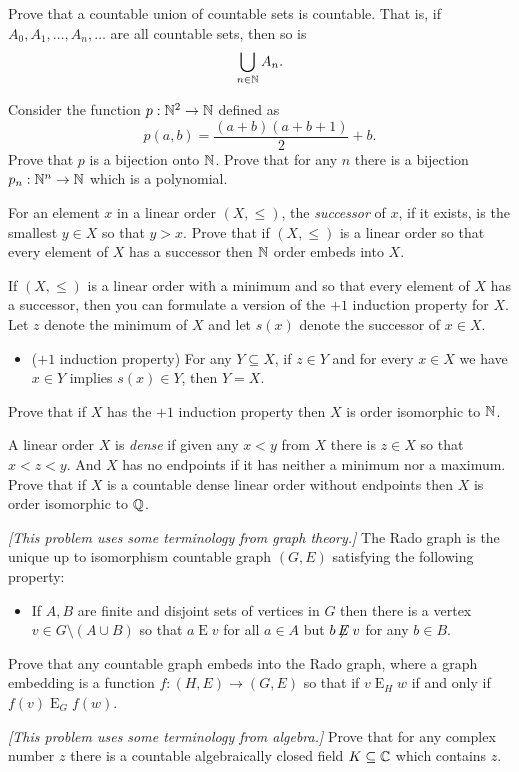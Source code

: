 \documentclass[10pt]{amsart}
\begin{document}
\begin{problem}
Prove that a countable union of countable sets is countable. That is, if $A_0, A_1, \ldots, A_n, \ldots$ are all countable sets, then so is
\[
\bigcup_{n \in \mathbb{N}} A_n.
\]
\end{problem}


\begin{problem}
Consider the function $p : \mathbb{N}^2 \to \mathbb{N}$ defined as 
\[
p(a,b) = \frac{(a+b)(a+b+1)}{2} + b.
\]
Prove that $p$ is a bijection onto $\mathbb{N}$. Prove that for any $n$ there is a bijection $p_n : \mathbb{N}^n \to \mathbb{N}$ which is a polynomial.
\end{problem}


\begin{problem}
For an element $x$ in a linear order $(X,\le)$, the \emph{successor} of $x$, if it exists, is the smallest $y \in X$ so that $y > x$. Prove that if $(X,\le)$ is a linear order so that every element of $X$ has a successor then $\mathbb{N}$ order embeds into $X$.
\end{problem}

\begin{problem}
If $(X,\le)$ is a linear order with a minimum and so that every element of $X$ has a successor, then you can formulate a version of the $+1$ induction property for $X$. Let $z$ denote the minimum of $X$ and let $s(x)$ denote the successor of $x \in X$.
\begin{itemize}
\item ($+1$ induction property) For any $Y \subseteq X$, if $z \in Y$ and for every $x \in X$ we have $x \in Y$ implies $s(x) \in Y$, then $Y = X$.
\end{itemize}
Prove that if $X$ has the $+1$ induction property then $X$ is order isomorphic to $\mathbb{N}$.
\end{problem}

\begin{problem}
A linear order $X$ is \emph{dense} if given any $x < y$ from $X$ there is $z \in X$ so that $x < z < y$. And $X$ has no endpoints if it has neither a minimum nor a maximum. Prove that if $X$ is a countable dense linear order without endpoints then $X$ is order isomorphic to $\mathbb{Q}$. 
\end{problem}

\newcommand\E{\mathbin{E}}
\newcommand\notE{\mathbin{\not\!\!E}}
\begin{problem}
\emph{[This problem uses some terminology from graph theory.]}
The Rado graph is the unique up to isomorphism countable graph $(G,E)$ satisfying the following property:
\begin{itemize}
\item If $A,B$ are finite and disjoint sets of vertices in $G$ then there is a vertex $v \in G \setminus (A \cup B)$ so that $a \E v$ for all $a \in A$ but $b \notE v$ for any $b \in B$.
\end{itemize}
Prove that any countable graph embeds into the Rado graph, where a graph embedding is a function $f : (H,E) \to (G,E)$ so that if $v \E_H w$ if and only if $f(v) \E_G f(w)$.
\end{problem}

\begin{problem}
\emph{[This problem uses some terminology from algebra.]}
Prove that for any complex number $z$ there is a countable algebraically closed field $K \subseteq \mathbb{C}$ which contains $z$.
\end{problem}
\end{document}
